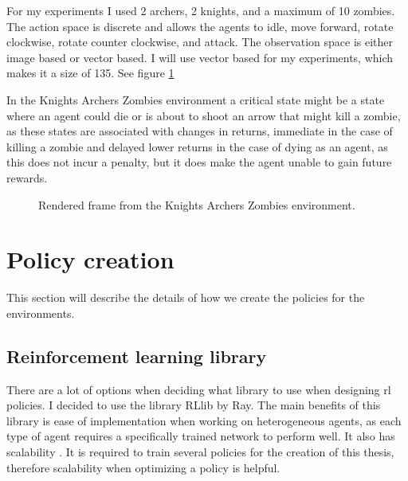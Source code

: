 \documentclass[UKenglish]{uiomasterthesis}
\begin{document}
For my experiments I used 2 archers, 2 knights, and a maximum of 10 zombies. The action space is discrete and allows the agents to idle, move forward, rotate clockwise, rotate counter clockwise, and attack. The observation space is either image based or vector based. I will use vector based for my experiments, which makes it a size of 135. See figure \ref{fig:kaz_env}

In the Knights Archers Zombies environment a critical state might be a state where an agent could die or is about to shoot an arrow that might kill a zombie, as these states are associated with changes in returns, immediate in the case of killing a zombie and delayed lower returns in the case of dying as an agent, as this does not incur a penalty, but it does make the agent unable to gain future rewards.

\begin{figure}[!ht]
    \centering
    \caption{Rendered frame from the Knights Archers Zombies environment.}
    \label{fig:kaz_env}
\end{figure}

\section{Policy creation}
This section will describe the details of how we create the policies for the environments.

\subsection{Reinforcement learning library}
There are a lot of options when deciding what library to use when designing \ac{rl} policies. I decided to use the library RLlib by Ray. The main benefits of this library is ease of implementation when working on heterogeneous agents, as each type of agent requires a specifically trained network to perform well. It also has scalability \cite{rayrllib}. It is required to train several policies for the creation of this thesis, therefore scalability when optimizing a policy is helpful.
\end{document}
